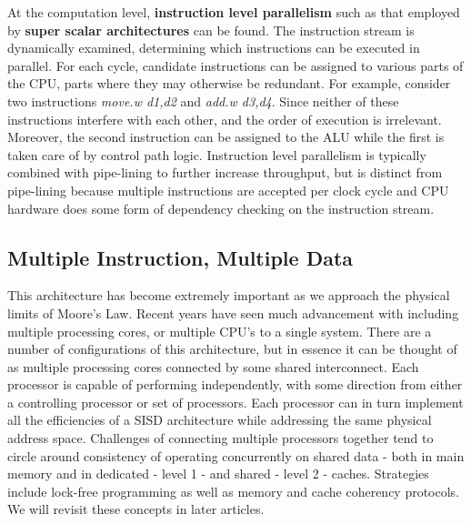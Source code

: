 \documentclass[10pt,a4paper]{article}
\begin{document}
At the computation level, {\bf instruction level parallelism} such as that employed by {\bf super scalar architectures} can be found. The instruction stream is dynamically examined, determining which instructions can be executed in parallel. For each cycle, candidate instructions can be assigned to various parts of the CPU, parts where they may otherwise be redundant. For example, consider two instructions {\it move.w d1,d2} and {\it add.w d3,d4}. Since neither of these instructions interfere with each other, and the order of execution is irrelevant. Moreover, the second instruction can be assigned to the ALU while the first is taken care of by control path logic. Instruction level parallelism is typically combined with pipe-lining to further increase throughput, but is distinct from pipe-lining because multiple instructions are accepted per clock cycle and CPU hardware does some form of dependency checking on the instruction stream. 
\subsection{Multiple Instruction, Multiple Data}
This architecture has become extremely important as we approach the physical limits of Moore's Law. Recent years have seen much advancement with including multiple processing cores, or multiple CPU's to a single system. There are a number of configurations of this architecture, but in essence it can be thought of as multiple processing cores connected by some shared interconnect. Each processor is capable of performing independently, with some direction from either a controlling processor or set of processors. Each processor can in turn implement all the efficiencies of a SISD architecture while addressing the same physical address space. Challenges of connecting multiple processors together tend to circle around  consistency of operating concurrently on shared data - both in main memory and in dedicated - level 1 - and shared - level 2 - caches. Strategies include lock-free programming as well as memory and cache coherency protocols. We will revisit these concepts in later articles.  
{}

\begin{center}
\end{center}
\end{document}
